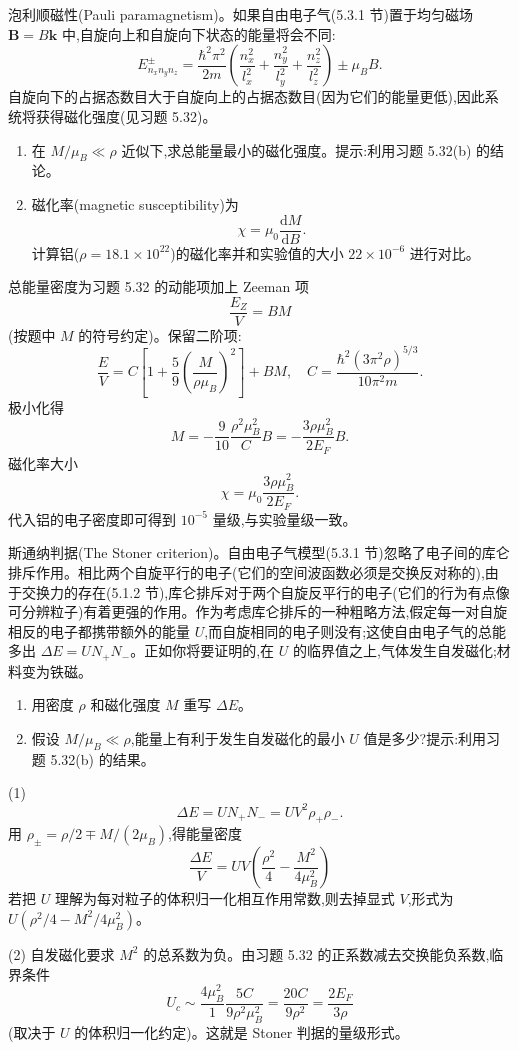 \begin{question}
泡利顺磁性(Pauli paramagnetism)。如果自由电子气(5.3.1 节)置于均匀磁场 $\mathbf B=B\hat{\mathbf k}$ 中,自旋向上和自旋向下状态的能量将会不同:
\[
E_{n_xn_yn_z}^{\pm}=\frac{\hbar^2\pi^2}{2m}\left(\frac{n_x^2}{l_x^2}+\frac{n_y^2}{l_y^2}+\frac{n_z^2}{l_z^2}\right)\pm \mu_B B.
\]
自旋向下的占据态数目大于自旋向上的占据态数目(因为它们的能量更低),因此系统将获得磁化强度(见习题 5.32)。
\begin{enumerate}
\item 在 $M/\mu_B\ll\rho$ 近似下,求总能量最小的磁化强度。提示:利用习题 5.32(b) 的结论。
\item 磁化率(magnetic susceptibility)为
\[
\chi=\mu_0\frac{\mathrm dM}{\mathrm dB}.
\]
计算铝($\rho=18.1\times10^{22}$)的磁化率并和实验值的大小 $22\times10^{-6}$ 进行对比。
\end{enumerate}
\begin{solution}

总能量密度为习题 5.32 的动能项加上 Zeeman 项
\[
\frac{E_Z}{V}=BM
\]
(按题中 $M$ 的符号约定)。保留二阶项:
\[
\frac EV=C\left[1+\frac59\left(\frac{M}{\rho\mu_B}\right)^2\right]+BM,
\quad C=\frac{\hbar^2(3\pi^2\rho)^{5/3}}{10\pi^2m}.
\]
极小化得
\[
M=-\frac{9}{10}\frac{\rho^2\mu_B^2}{C}B
=-\frac{3\rho\mu_B^2}{2E_F}B.
\]
磁化率大小
\[
\chi=\mu_0\frac{3\rho\mu_B^2}{2E_F}.
\]
代入铝的电子密度即可得到 $10^{-5}$ 量级,与实验量级一致。

\end{solution}
\end{question}

\begin{question}
斯通纳判据(The Stoner criterion)。自由电子气模型(5.3.1 节)忽略了电子间的库仑排斥作用。相比两个自旋平行的电子(它们的空间波函数必须是交换反对称的),由于交换力的存在(5.1.2 节),库仑排斥对于两个自旋反平行的电子(它们的行为有点像可分辨粒子)有着更强的作用。作为考虑库仑排斥的一种粗略方法,假定每一对自旋相反的电子都携带额外的能量 $U$,而自旋相同的电子则没有;这使自由电子气的总能多出 $\Delta E=U N_+N_-$。正如你将要证明的,在 $U$ 的临界值之上,气体发生自发磁化;材料变为铁磁。
\begin{enumerate}
\item 用密度 $\rho$ 和磁化强度 $M$ 重写 $\Delta E$。
\item 假设 $M/\mu_B\ll\rho$,能量上有利于发生自发磁化的最小 $U$ 值是多少?提示:利用习题 5.32(b) 的结果。
\end{enumerate}
\begin{solution}

(1) 
\[
\Delta E=UN_+N_-=UV^2\rho_+\rho_-.
\]
用 $\rho_\pm=\rho/2\mp M/(2\mu_B)$,得能量密度
\[
\frac{\Delta E}{V}=UV\left(\frac{\rho^2}{4}-\frac{M^2}{4\mu_B^2}\right)
\]
若把 $U$ 理解为每对粒子的体积归一化相互作用常数,则去掉显式 $V$,形式为 $U(\rho^2/4-M^2/4\mu_B^2)$。

(2) 自发磁化要求 $M^2$ 的总系数为负。由习题 5.32 的正系数减去交换能负系数,临界条件
\[
U_c\sim \frac{4\mu_B^2}{1}\frac{5C}{9\rho^2\mu_B^2}
=\frac{20C}{9\rho^2}
=\frac{2E_F}{3\rho}
\]
(取决于 $U$ 的体积归一化约定)。这就是 Stoner 判据的量级形式。

\end{solution}
\end{question}

